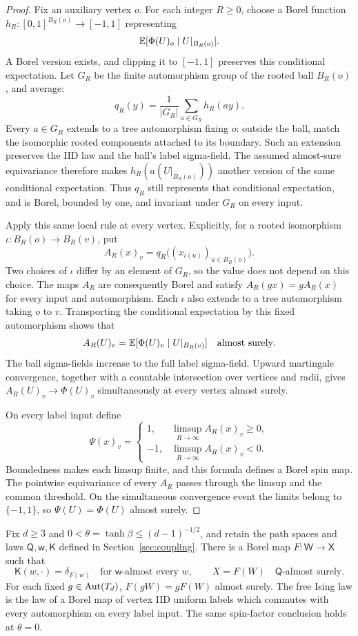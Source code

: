 \begin{proof}
Fix an auxiliary vertex $o$. For each integer $R\ge0$, choose a
Borel function $h_R:[0,1]^{B_R(o)}\to[-1,1]$ representing
\[
 \mathbb E[\Phi(U)_o\mid U|_{B_R(o)}].
\]
A Borel version exists, and clipping it to $[-1,1]$ preserves this
conditional expectation. Let $G_R$ be the finite automorphism group
of the rooted ball $B_R(o)$, and average:
\[
 q_R(y)=\frac1{|G_R|}\sum_{a\in G_R}h_R(ay).
\]
Every $a\in G_R$ extends to a tree automorphism fixing $o$: outside
the ball, match the isomorphic rooted components attached to its
boundary. Such an extension preserves the IID law and the ball's
label sigma-field. The assumed almost-sure equivariance therefore
makes $h_R(a(U|_{B_R(o)}))$ another version of the same conditional
expectation. Thus $q_R$ still represents that conditional expectation,
and is Borel, bounded by one, and invariant under $G_R$ on every input.

Apply this same local rule at every vertex. Explicitly, for a rooted
isomorphism $\iota:B_R(o)\to B_R(v)$, put
\[
 A_R(x)_v=q_R\bigl((x_{\iota(u)})_{u\in B_R(o)}\bigr).
\]
Two choices of $\iota$ differ by an element of $G_R$, so the value
does not depend on this choice. The maps $A_R$ are consequently
Borel and satisfy $A_R(gx)=gA_R(x)$ for every input and automorphism.
Each $\iota$ also extends to a tree automorphism taking $o$ to $v$.
Transporting the conditional expectation by this fixed automorphism
shows that
\[
 A_R(U)_v=\mathbb E[\Phi(U)_v\mid U|_{B_R(v)}]
                  \quad\text{almost surely}.
\]
The ball sigma-fields increase to the full label sigma-field.
Upward martingale convergence, together with a countable intersection
over vertices and radii, gives $A_R(U)_v\to\Phi(U)_v$ simultaneously
at every vertex almost surely.

On every label input define
\[
 \Psi(x)_v=
 \begin{cases}
  1,&\limsup_{R\to\infty} A_R(x)_v\ge0,\\
 -1,&\limsup_{R\to\infty} A_R(x)_v<0.
 \end{cases}
\]
Boundedness makes each limsup finite, and this formula defines a
Borel spin map. The pointwise equivariance of every $A_R$ passes
through the limsup and the common threshold. On the simultaneous
convergence event the limits belong to $\{-1,1\}$, so
$\Psi(U)=\Phi(U)$ almost surely.
\end{proof}

\begin{proposition}
\label{prop:factor-extraction}
Fix $d\ge3$ and $0<\theta=\tanh\beta\le(d-1)^{-1/2}$, and retain
the path spaces and laws $\mathsf Q,\mathsf w,\mathsf K$ defined in
Section~\ref{sec:coupling}. There is a Borel map
$F:\mathsf W\to\mathsf X$ such that
\[
 \mathsf K(w,\cdot)=\delta_{F(w)}
       \quad\text{for $\mathsf w$-almost every }w,
 \qquad X=F(W)\quad\mathsf Q\text{-almost surely}.
\]
For each fixed $g\in\operatorname{Aut}(T_d)$,
$F(gW)=gF(W)$ almost surely. The free Ising law is the law of a
Borel map of vertex IID uniform labels which commutes with every
automorphism on every label input. The same spin-factor
conclusion holds at $\theta=0$.
\end{proposition}

